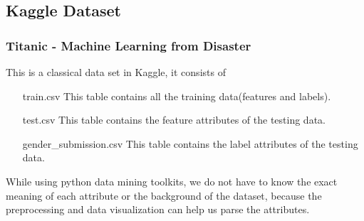 \documentclass{beamer}
\begin{document}
\subsection{Kaggle Dataset}
\begin{frame}
	\frametitle{Titanic - Machine Learning from Disaster}


	\begin{flushleft}
		This is a classical data set in Kaggle, it consists of
		\begin{center}
			\begin{minipage}{0.8\textwidth}
				\begin{itemize}
					\item[train.csv] This table contains all the training data(features and labels).
					\item[test.csv] This table contains the feature attributes of the testing data.
					\item[{\tiny gender\_submission.csv}] This table contains the label attributes of the testing data.
				\end{itemize}
			\end{minipage}
		\end{center}
		While using python data mining toolkits, we do not have to know the exact meaning of each attribute or the background of the dataset, because the preprocessing and data visualization can help us parse the attributes.
	\end{flushleft}
\end{frame}

\end{document}
